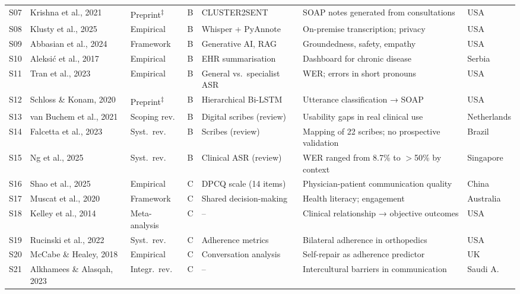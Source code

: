\documentclass[review,12pt]{elsarticle}
\begin{document}
\begin{longtable}{p{0.65cm} p{2.4cm} p{1.55cm} p{0.55cm} p{2.2cm} p{2.35cm} p{1.4cm}}
S07 & Krishna et al., 2021   & Preprint\textsuperscript{‡} & B & CLUSTER2SENT    & SOAP notes generated from consultations & USA          \\
S08 & Klusty et al., 2025    & Empirical    & B & Whisper + PyAnnote         & On-premise transcription; privacy      & USA           \\
S09 & Abbasian et al., 2024  & Framework    & B & Generative AI, RAG         & Groundedness, safety, empathy          & USA           \\
S10 & Aleksić et al., 2017  & Empirical & B & EHR summarisation & Dashboard for chronic disease & Serbia  \\
S11 & Tran et al., 2023      & Empirical    & B & General vs.\ specialist ASR & WER; errors in short pronouns         & USA           \\
S12 & Schloss \& Konam, 2020 & Preprint\textsuperscript{‡} & B & Hierarchical Bi-LSTM & Utterance classification → SOAP  & USA          \\
S13 & van Buchem et al., 2021 & Scoping rev. & B & Digital scribes (review) & Usability gaps in real clinical use   & Netherlands   \\
S14 & Falcetta et al., 2023  & Syst.\ rev.  & B & Scribes (review)           & Mapping of 22 scribes; no prospective validation & Brazil \\
S15 & Ng et al., 2025        & Syst.\ rev.  & B & Clinical ASR (review)      & WER ranged from 8.7\% to $>$50\% by context & Singapore \\
S16 & Shao et al., 2025      & Empirical    & C & DPCQ scale (14 items)      & Physician-patient communication quality & China       \\
S17 & Muscat et al., 2020    & Framework    & C & Shared decision-making     & Health literacy; engagement            & Australia   \\
S18 & Kelley et al., 2014    & Meta-analysis & C & --                        & Clinical relationship → objective outcomes & USA     \\
S19 & Rucinski et al., 2022  & Syst.\ rev.  & C & Adherence metrics          & Bilateral adherence in orthopedics     & USA           \\
S20 & McCabe \& Healey, 2018 & Empirical    & C & Conversation analysis      & Self-repair as adherence predictor     & UK            \\
S21 & Alkhamees \& Alasqah, 2023 & Integr.\ rev. & C & --               & Intercultural barriers in communication & Saudi A.    \\

\end{longtable}
\end{document}
